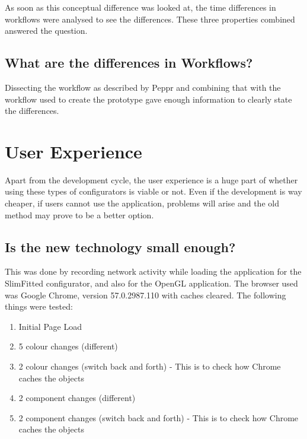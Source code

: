 As soon as this conceptual difference was looked at, the time differences in workflows were analysed to see the differences. \newline
These three properties combined answered the question.

\subsection{What are the differences in Workflows?}
Dissecting the workflow as described by Peppr and combining that with the workflow used to create the prototype gave enough information to clearly state the differences.

\section{User Experience}
Apart from the development cycle, the user experience is a huge part of whether using these types of configurators is viable or not. Even if the development is way cheaper, if users cannot use the application, problems will arise and the old method may prove to be a better option.

\subsection{Is the new technology small enough?}
This was done by recording network activity while loading the application for the SlimFitted configurator, and also for the OpenGL application. The browser used was Google Chrome, version 57.0.2987.110 with caches cleared. The following things were tested:
\label{subsub:techSmall}
​\begin{enumerate}
\item {Initial Page Load}
\item{5 colour changes (different)}
\item {2 colour changes (switch back and forth) - This is to check how Chrome caches the objects}
\item {2 component changes (different)}
\item {2 component changes (switch back and forth) - This is to check how Chrome caches the objects}
\end{enumerate}

